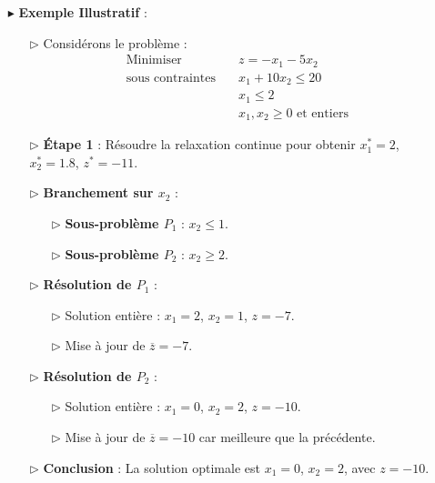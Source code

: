 \documentclass{report}
\begin{document}
\begin{multicols*}{2}
\begin{itemize}
    \item[$\blacktriangleright$] \textbf{Exemple Illustratif} :
    \begin{itemize}
        \item[$\rhd$] Considérons le problème :
        \[
        \begin{aligned}
        \text{Minimiser} & \quad z = -x_1 - 5x_2 \\
        \text{sous contraintes} & \quad x_1 + 10x_2 \leq 20 \\
        & \quad x_1 \leq 2 \\
        & \quad x_1, x_2 \geq 0 \text{ et entiers}
        \end{aligned}
        \]
        \item[$\rhd$] \textbf{Étape 1} : Résoudre la relaxation continue pour obtenir \( x_1^* = 2 \), \( x_2^* = 1.8 \), \( z^* = -11 \).
        \item[$\rhd$] \textbf{Branchement sur \( x_2 \)} :
        \begin{itemize}
            \item[$\rhd$] \textbf{Sous-problème \( P_1 \)} : \( x_2 \leq 1 \).
            \item[$\rhd$] \textbf{Sous-problème \( P_2 \)} : \( x_2 \geq 2 \).
        \end{itemize}
        \item[$\rhd$] \textbf{Résolution de \( P_1 \)} :
        \begin{itemize}
            \item[$\rhd$] Solution entière : \( x_1 = 2 \), \( x_2 = 1 \), \( z = -7 \).
            \item[$\rhd$] Mise à jour de \( \overline{z} = -7 \).
        \end{itemize}
        \item[$\rhd$] \textbf{Résolution de \( P_2 \)} :
        \begin{itemize}
            \item[$\rhd$] Solution entière : \( x_1 = 0 \), \( x_2 = 2 \), \( z = -10 \).
            \item[$\rhd$] Mise à jour de \( \overline{z} = -10 \) car meilleure que la précédente.
        \end{itemize}
        \item[$\rhd$] \textbf{Conclusion} : La solution optimale est \( x_1 = 0 \), \( x_2 = 2 \), avec \( z = -10 \).
    \end{itemize}
\end{itemize}
\begin{tikzpicture}[scale=0.9]


\end{tikzpicture}
\end{multicols*}
\end{document}

